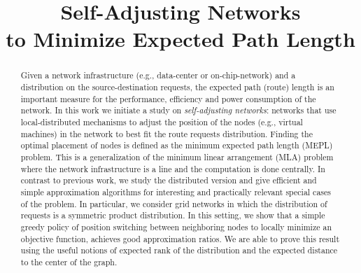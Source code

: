 \documentclass[conference]{IEEEtran}
\begin{document}
\title{Self-Adjusting Networks \\ to Minimize Expected Path Length}



\author{
}





\maketitle


\begin{abstract}
Given a network infrastructure (e.g., data-center or on-chip-network) and a distribution on the source-destination requests, the expected path (route) length is an important measure for the performance, efficiency and power consumption of the network.
In this work we initiate a study on \emph{self-adjusting networks}: networks that use local-distributed mechanisms to adjust the position of the nodes (e.g., virtual machines) in the network to best fit the route requests distribution. 
Finding the optimal placement of nodes is defined as the minimum expected path length (MEPL) problem. 
This is a generalization of the minimum linear arrangement (MLA) problem where the network infrastructure is a line and the computation is done centrally. In contrast to previous work, we study the distributed version and give efficient and simple approximation algorithms for interesting and practically relevant special cases of the problem. In particular, we consider grid networks in which the distribution of requests is a symmetric product distribution. In this setting, we show that a simple greedy policy of position switching between neighboring nodes to locally minimize an objective function, achieves good approximation ratios. We are able to prove this result using the useful notions of expected rank of the distribution and the expected distance to the center of the graph.
\end{abstract} 
\end{document}
